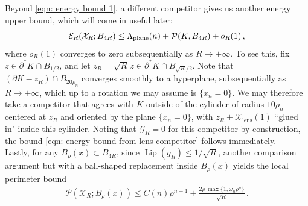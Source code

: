\documentclass[10pt,reqno]{amsart}
\numberwithin{equation}{section}
\newcommand{\remove}[1]{{\color{gray!90!black}#1}}
\theoremstyle{definition}
\newcommand{\Gcal}{\mathcal{G}}
\newcommand{\cG}{\mathcal{G}}
\DeclareMathOperator{\Lip}{Lip}
\DeclareMathOperator{\lens}{lens}
\newcommand{\X}{\mathcal{X}}
\begin{document}
{
Beyond \eqref{eqn: energy bound 1}, a different competitor gives us another energy upper bound, {which will come in useful later: 
\begin{equation}
    \label{eqn: energy bound from lens competitor}
 \mathcal{E}_R(\X_R;B_{4R}) \leq \Lambda_{\rm plane}(n) + \mathcal{P}(K,B_{4R}  )+ o_R(1)\,,
\end{equation}
where $o_R(1)$ converges to zero subsequentially as $R\to +\infty$. To see this, fix $z \in \partial^* K \cap B_{1/2}$, 
%
and let $z_R ={\sqrt{R}} \, z \in \partial^*K \cap B_{{\sqrt{R}}/2}$. Note that $(\partial K -z_R) \cap B_{20 \rho_n}$ converges smoothly to a hyperplane, subsequentially as $R\to +\infty$, which up to a rotation we may assume is $\{x_n=0\}$. We may therefore take a competitor that agrees with $K$ outside of the cylinder of radius $10\rho_n$ centered at $z_R$ and oriented by the plane $\{x_n=0\}$, with $z_R + \X_{\lens}(1)$ ``glued in" inside this cylinder. 
Noting that $\Gcal_R=0$ for this competitor by construction, the bound \eqref{eqn: energy bound from lens competitor} follows immediately.}
\\


Lastly, for any $B_\rho(x) \subset B_{4R}$, since ${\Lip(g_R)}\leq 1/\sqrt{R}$, 
another comparison argument but with a ball-shaped replacement inside $B_\rho(x)$ yields the local perimeter bound
\begin{align}\label{eq:first energy bound}
    \mathcal{P}(\X_R;B_\rho(x))
    \leq C(n)\rho^{n-1} + \frac{2\rho\,\max\{ 1, \omega_n \rho^n\}}{\sqrt{R}}\,.
\end{align}

}
\end{document}
